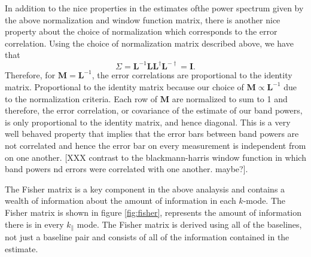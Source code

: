 \documentclass[twocolumn,numberedappendix]{emulateapj} \shorttitle{PSA64}
\begin{document}
In addition to the nice properties in the estimates ofthe power spectrum given
by the above normalization and window function matrix, there is another nice
property about the choice of normalization which corresponds to the error
correlation. Using the choice of normalization matrix described above, we have
that \begin{equation} 
    \Sigma = \mathbf{L}^{-1}\mathbf{L}\mathbf{L}^{\dagger}\mathbf{L}^{-\dagger}
           = \mathbf{I}.
\end{equation}
Therefore, for $\mathbf{M}=\mathbf{L}^{-1}$, the error correlations are
proportional to the identity matrix. Proportional to the identity matrix because
our choice of $\mathbf{M} \propto \mathbf{L}^{-1}$ due to the normalization
criteria. Each row of $\mathbf{M}$ are normalized to sum to 1 and therefore,
the error correlation, or covariance of the estimate of our band powers, is only
proportional to the identity matrix, and hence diagonal. This is a very well
behaved property that implies that the error bars between band powers are not
correlated and hence the error bar on every measurement is independent from on
one another. [XXX contrast to the blackmann-harris window function in which
band powers nd errors were correlated with one another. maybe?].

The Fisher matrix is a key component in the above analaysis and contains a
wealth of information about the amount of information in each $k$-mode. The
Fisher matrix is shown in figure \ref{fig:fisher}, represents the amount of
information there is in every $k_{\parallel}$ mode. The Fisher matrix is derived
using all of the baselines, not just a baseline pair and consists of all of the
information contained in the estimate.
\end{document}
